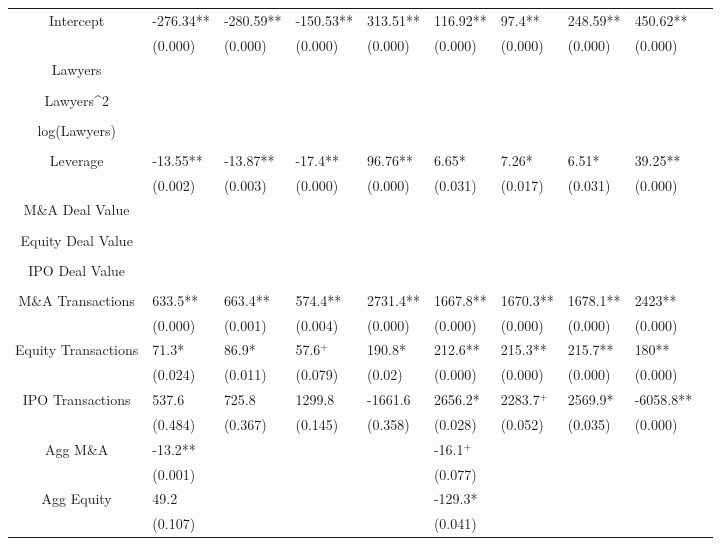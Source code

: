 \documentclass{article}
\begin{document}
\begin{table}[H]
\begin{tabular}{|clllllllll|}
Intercept & -276.34** & -280.59** & -150.53** & 313.51** & 116.92** & 97.4** & 248.59** & 450.62** & \\ 
   & (0.000) & (0.000) & (0.000) & (0.000) & (0.000) & (0.000) & (0.000) & (0.000) & \\ 
  Lawyers &  &  &  &  &  &  &  &  & \\ 
   &  &  &  &  &  &  &  &  & \\ 
  Lawyers^2 &  &  &  &  &  &  &  &  & \\ 
   &  &  &  &  &  &  &  &  & \\ 
  log(Lawyers) &  &  &  &  &  &  &  &  & \\ 
   &  &  &  &  &  &  &  &  & \\ 
  Leverage & -13.55** & -13.87** & -17.4** & 96.76** & 6.65* & 7.26* & 6.51* & 39.25** & \\ 
   & (0.002) & (0.003) & (0.000) & (0.000) & (0.031) & (0.017) & (0.031) & (0.000) & \\ 
  M\&A Deal Value &  &  &  &  &  &  &  &  & \\ 
   &  &  &  &  &  &  &  &  & \\ 
  Equity Deal Value &  &  &  &  &  &  &  &  & \\ 
   &  &  &  &  &  &  &  &  & \\ 
  IPO Deal Value &  &  &  &  &  &  &  &  & \\ 
   &  &  &  &  &  &  &  &  & \\ 
  M\&A Transactions & 633.5** & 663.4** & 574.4** & 2731.4** & 1667.8** & 1670.3** & 1678.1** & 2423** & \\ 
   & (0.000) & (0.001) & (0.004) & (0.000) & (0.000) & (0.000) & (0.000) & (0.000) & \\ 
  Equity Transactions & 71.3* & 86.9* & 57.6$^{+}$ & 190.8* & 212.6** & 215.3** & 215.7** & 180** & \\ 
   & (0.024) & (0.011) & (0.079) & (0.02) & (0.000) & (0.000) & (0.000) & (0.000) & \\ 
  IPO Transactions & 537.6 & 725.8 & 1299.8 & -1661.6 & 2656.2* & 2283.7$^{+}$ & 2569.9* & -6058.8** & \\ 
   & (0.484) & (0.367) & (0.145) & (0.358) & (0.028) & (0.052) & (0.035) & (0.000) & \\ 
  Agg M\&A & -13.2** &  &  &  & -16.1$^{+}$ &  &  &  & \\ 
   & (0.001) &  &  &  & (0.077) &  &  &  & \\ 
  Agg Equity & 49.2 &  &  &  & -129.3* &  &  &  & \\ 
   & (0.107) &  &  &  & (0.041) &  &  &  & \\ 

\end{tabular}
\end{table}
\end{document}
